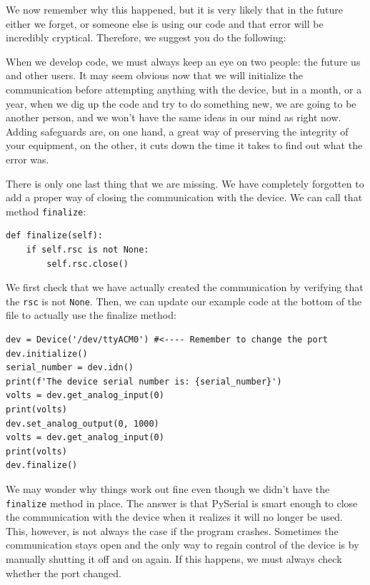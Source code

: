 We now remember why this happened, but it is very likely that in the future either we forget, or someone else is using our code and that error will be incredibly cryptical. Therefore, we suggest you do the following:


When we develop code, we must always keep an eye on two people: the future us and other users. It may seem obvious now that we will initialize the communication before attempting anything with the device, but in a month, or a year, when we dig up the code and try to do something new, we are going to be another person, and we won't have the same ideas in our mind as right now. Adding safeguards are, on one hand, a great way of preserving the integrity of your equipment, on the other, it cuts down the time it takes to find out what the error was.

There is only one last thing that we are missing. We have completely forgotten to add a proper way of closing the communication with the device. We can call that method \texttt{finalize}:

\begin{verbatim}
def finalize(self):
    if self.rsc is not None:
        self.rsc.close()
\end{verbatim}

We first check that we have actually created the communication by verifying that the \texttt{rsc} is not \texttt{None}. Then, we can update our example code at the bottom of the file to actually use the finalize method:

\begin{verbatim}
dev = Device('/dev/ttyACM0') #<---- Remember to change the port
dev.initialize()
serial_number = dev.idn()
print(f'The device serial number is: {serial_number}')
volts = dev.get_analog_input(0)
print(volts)
dev.set_analog_output(0, 1000)
volts = dev.get_analog_input(0)
print(volts)
dev.finalize()
\end{verbatim}

We may wonder why things work out fine even though we didn't have the \texttt{finalize} method in place. The answer is that PySerial is smart enough to close the communication with the device when it realizes it will no longer be used. This, however, is not always the case if the program crashes. Sometimes the communication stays open and the only way to regain control of the device is by manually shutting it off and on again. If this happens, we must always check whether the port changed. 

